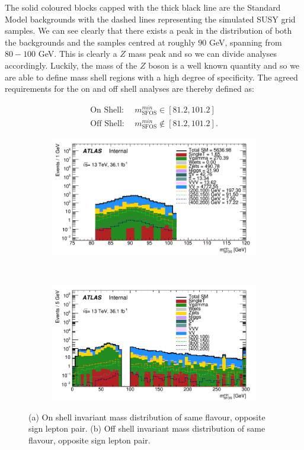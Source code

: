 \noindent The solid coloured blocks capped with the thick black line are the Standard Model backgrounds with the dashed lines representing the simulated SUSY grid samples.
We can see clearly that there exists a peak in the distribution of both the backgrounds and the samples centred at roughly $90$ GeV, spanning from $80 - 100$ GeV.
This is clearly a $Z$ mass peak and so we can divide analyses accordingly.
Luckily, the mass of the $Z$ boson is a well known quantity and so we are able to define mass shell regions with a high degree of specificity.
The agreed requirements for the on and off shell analyses are thereby defined as:

\begin{align} 
\textrm{On Shell:}\ \ &m_{\textrm{SFOS}}^{min} \in [81.2, 101.2] \\
\textrm{Off Shell:}\ \ &m_{\textrm{SFOS}}^{min} \notin [81.2, 101.2].
\end{align}

\begin{figure}[H]
    \centering
    \begin{subfigure}[b]{0.48\textwidth}
        \centering
        \includegraphics[width=\textwidth]{Pictures/OnMassShell.png}
    \caption{}
    \end{subfigure}
    ~
    \begin{subfigure}[b]{0.48\textwidth}
        \centering
        \includegraphics[width=\textwidth]{Pictures/OffMassShell.png}
    \caption{}    
        \end{subfigure}
\caption{(a) On shell invariant mass distribution of same flavour, opposite sign lepton pair.
(b) Off shell invariant mass distribution of same flavour, opposite sign lepton pair.}
\label{fig:}
\end{figure}


